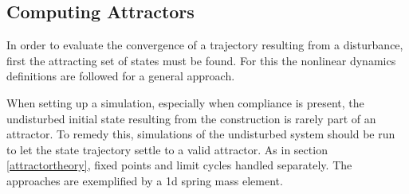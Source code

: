 









\subsection{Computing Attractors} \label{attractors}

In order to evaluate the convergence of a trajectory resulting from a disturbance, first the attracting set of states must be found. For this the nonlinear dynamics definitions are followed for a general approach.


When setting up a simulation, especially when compliance is present, the undisturbed initial state resulting from the construction is rarely part of an attractor. To remedy this, simulations of the undisturbed system should be run to let the state trajectory settle to a valid attractor. As in section \ref{attractortheory}, fixed points and limit cycles handled separately. The approaches are exemplified by a 1d spring mass element. 

